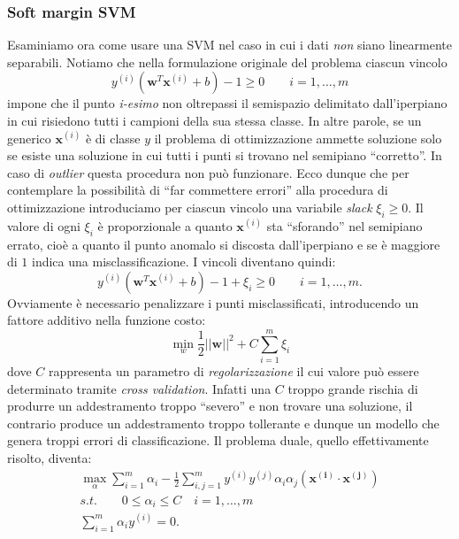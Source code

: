 \subsubsection{Soft margin SVM}
Esaminiamo ora come usare una SVM nel caso in cui i dati \emph{non} siano linearmente separabili. Notiamo che nella formulazione originale del problema ciascun vincolo
\begin{equation*}
y^{(i)}\left(\mathbf{w}^T \mathbf{x}^{(i)} + b\right) -1 \geq 0 \qquad i=1, \dots, m
\end{equation*}
impone che il punto \emph{i-esimo} non oltrepassi il semispazio delimitato dall'iperpiano in cui risiedono tutti i campioni della sua stessa classe. In altre parole, se un generico $\mathbf{x}^{(i)}$ è di classe $y$ il problema di ottimizzazione ammette soluzione solo se esiste una soluzione in cui tutti i punti si trovano nel semipiano ``corretto''. In caso di \emph{outlier} questa procedura non può funzionare. Ecco dunque che per contemplare la possibilità di ``far commettere errori'' alla procedura di ottimizzazione introduciamo per ciascun vincolo una variabile \emph{slack} $\xi_i \geq 0$. Il valore di ogni $\xi_i$ è proporzionale a quanto $\mathbf{x}^{(i)}$ sta ``sforando'' nel semipiano errato, cioè a quanto il punto anomalo si discosta dall'iperpiano e se è maggiore di $1$ indica una misclassificazione. I vincoli diventano quindi:
\begin{equation*}
y^{(i)}\left(\mathbf{w}^T \mathbf{x}^{(i)} + b\right) -1 + \xi_i \geq 0 \qquad i=1, \dots, m.
\end{equation*}
Ovviamente è necessario penalizzare i punti misclassificati, introducendo un fattore additivo nella funzione costo:
\begin{equation*}
\min_w \frac{1}{2} ||\mathbf{w}||^2 + C \sum_{i=1}^m \xi_i
\end{equation*}
dove $C$ rappresenta un parametro di \emph{regolarizzazione} il cui valore può essere determinato tramite \emph{cross validation}. Infatti una $C$ troppo grande rischia di produrre un addestramento troppo ``severo'' e non trovare una soluzione, il contrario produce un addestramento troppo tollerante e dunque un modello che genera troppi errori di classificazione. Il problema duale, quello effettivamente risolto, diventa:
\begin{gather*}
\max_\alpha \sum_{i=1}^m \alpha_i - \frac{1}{2} \sum_{i,j=1}^m y^{(i)} y^{(j)} \alpha_i \alpha_j (\mathbf{x^{(i)}}\cdot\mathbf{ x^{(j)}} )\\
s.t. \qquad 0 \leq \alpha_i \leq C \quad i=1,\dots,m \\
\sum_{i=1}^m \alpha_i y^{(i)} = 0.
\end{gather*}

